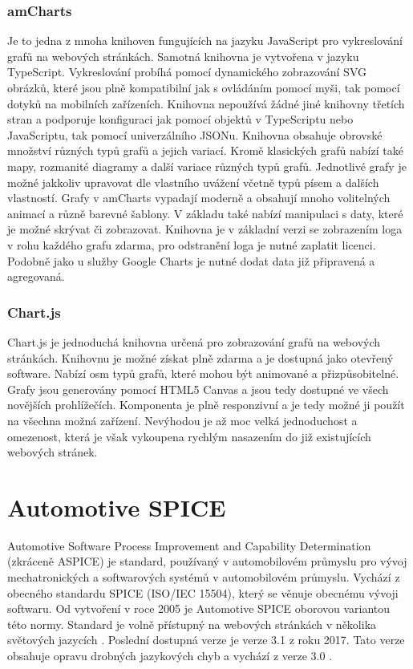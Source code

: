 \documentclass[czech,master,public,dept460,male,cpdeclaration,oneside]{diploma}
\begin{document}
\subsubsection{amCharts}
\label{sec:amcharts}
Je to jedna z mnoha knihoven fungujících na jazyku JavaScript pro vykreslování grafů na webových stránkách. Samotná knihovna je vytvořena v jazyku TypeScript. Vykreslování probíhá pomocí dynamického zobrazování SVG obrázků, které jsou plně kompatibilní jak s ovládáním pomocí myši, tak pomocí dotyků na mobilních zařízeních. Knihovna nepoužívá žádné jiné knihovny třetích stran a podporuje konfiguraci jak pomocí objektů v TypeScriptu nebo JavaScriptu, tak pomocí univerzálního JSONu. Knihovna obsahuje obrovské množství různých typů grafů a jejich variací. Kromě klasických grafů nabízí také mapy, rozmanité diagramy a další variace různých typů grafů. Jednotlivé grafy je možné jakkoliv upravovat dle vlastního uvážení včetně typů písem a dalších vlastností. Grafy v amCharts vypadají moderně a obsahují mnoho volitelných animací a různě barevné šablony.  V základu také nabízí manipulaci s daty, které je možné skrývat či zobrazovat. Knihovna je v základní verzi se zobrazením loga v rohu každého grafu zdarma, pro odstranění loga je nutné zaplatit licenci. Podobně jako u služby Google Charts je nutné dodat data již připravená a agregovaná. \cite{ref:amcharts_web}

\subsubsection{Chart.js}
\label{sec:chartjs}
Chart.js je jednoduchá knihovna určená pro zobrazování grafů na webových stránkách. Knihovnu je možné získat plně zdarma a je dostupná jako otevřený software. Nabízí osm typů grafů, které mohou být animované a přizpůsobitelné. Grafy jsou generovány pomocí HTML5 Canvas a jsou tedy dostupné ve všech novějších prohlížečích. Komponenta je plně responzivní a je tedy možné ji použít na všechna možná zařízení. Nevýhodou je až moc velká jednoduchost a omezenost, která je však vykoupena rychlým nasazením do již existujících webových stránek. \cite{ref:chartjs}



\section{Automotive SPICE}
\label{sec:aspice}
Automotive Software Process Improvement and Capability Determination (zkráceně ASPICE) je standard, používaný v automobilovém průmyslu pro vývoj mechatronických a softwarových systémů v automobilovém průmyslu. Vychází z obecného standardu SPICE (ISO/IEC 15504), který se věnuje obecnému vývoji softwaru. Od vytvoření v roce 2005 je Automotive SPICE oborovou variantou této normy. Standard je volně přístupný na webových stránkách v několika světových jazycích \cite{ref:aspice_download_obecne}. Poslední dostupná verze je verze 3.1 z roku 2017. Tato verze obsahuje opravu drobných jazykových chyb a vychází z verze 3.0 \cite{ref:aspice_download_verze}.
\end{document}

